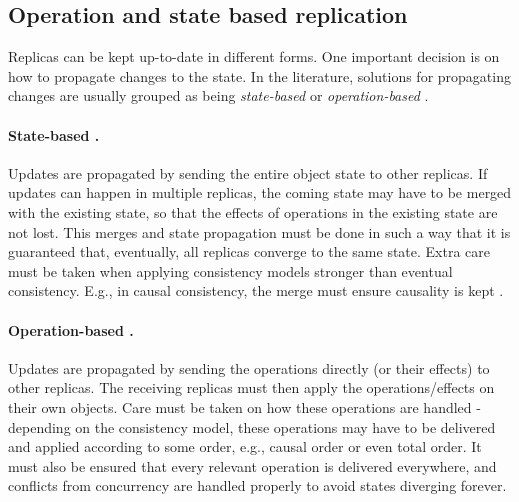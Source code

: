 
\subsection{Operation and state based replication}
\label{subsec:operationStateReplication}

Replicas can be kept up-to-date in different forms.
One important decision is on how to propagate changes to the state.
In the literature, solutions for propagating changes are usually grouped as being \emph{state-based} or \emph{operation-based} \cite{crdt}.


\paragraph{State-based \cite{crdt}.} Updates are propagated by sending the entire object state to other replicas.
If updates can happen in multiple replicas, the coming state may have to be merged with the existing state, so that the effects of operations in the existing state are not lost.
This merges and state propagation must be done in such a way that it is guaranteed that, eventually, all replicas converge to the same state.
Extra care must be taken when applying consistency models stronger than eventual consistency.
E.g., in causal consistency, the merge must ensure causality is kept \cite{understandingEC}.

\paragraph{Operation-based \cite{crdt}.}
Updates are propagated by sending the operations directly (or their effects) to other replicas.
The receiving replicas must then apply the operations/effects on their own objects.
Care must be taken on how these operations are handled - depending on the consistency model, these operations may have to be delivered and applied according to some order, e.g., causal order or even total order.
It must also be ensured that every relevant operation is delivered everywhere, and conflicts from concurrency are handled properly to avoid states diverging forever.

